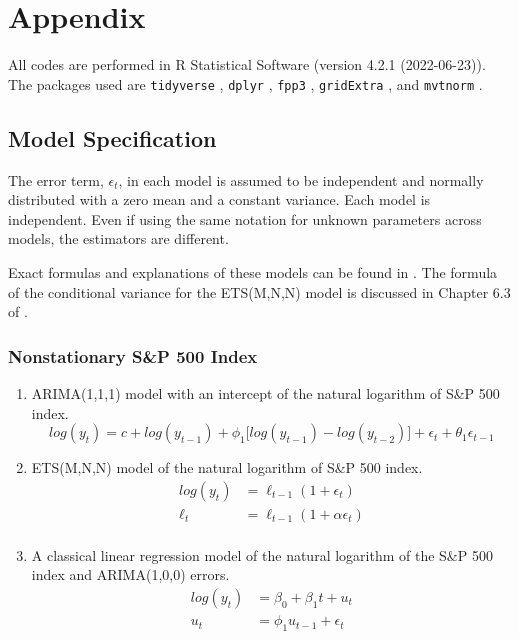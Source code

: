 \documentclass{monashthesis}
\begin{document}
\appendix

\hypertarget{appendix}{%
\chapter{Appendix}\label{appendix}}

All codes are performed in R Statistical Software (version 4.2.1 (2022-06-23)). The packages used are \texttt{tidyverse} \autocite{tidy19}, \texttt{dplyr} \autocite{dplyr23}, \texttt{fpp3} \autocite{fpp23}, \texttt{gridExtra} \autocite{gridExtra}, and \texttt{mvtnorm} \autocite{GBMMLSH21}.

\hypertarget{model-specification}{%
\section{Model Specification}\label{model-specification}}

The error term, \(\epsilon_t\), in each model is assumed to be independent and normally distributed with a zero mean and a constant variance. Each model is independent. Even if using the same notation for unknown parameters across models, the estimators are different.

Exact formulas and explanations of these models can be found in \textcite{fpp3}. The formula of the conditional variance for the ETS(M,N,N) model is discussed in Chapter 6.3 of \textcite{HKOS08}.

\hypertarget{nonstationary-sp-500-index}{%
\subsection{Nonstationary S\&P 500 Index}\label{nonstationary-sp-500-index}}

\begin{enumerate}
\def\labelenumi{\arabic{enumi}.}
\item
  ARIMA(1,1,1) model with an intercept of the natural logarithm of S\&P 500 index.
  \begin{equation*}
  log(y_t) = c + log(y_{t-1}) + \phi_1\big[log(y_{t-1})-log(y_{t-2})\big] + \epsilon_t + \theta_1\epsilon_{t-1}
  \end{equation*}
\item
  ETS(M,N,N) model of the natural logarithm of S\&P 500 index.
  \begin{align*}
  log(y_t) &= \ell_{t-1} (1+\epsilon_t) \\
  \ell_t &= \ell_{t-1} (1+\alpha \epsilon_t) \\
  \end{align*}
\item
  A classical linear regression model of the natural logarithm of the S\&P 500 index and ARIMA(1,0,0) errors.
  \begin{align*}
  log(y_t) &= \beta_0 + \beta_1 t + u_t \\
  u_t &= \phi_1 u_{t-1} + \epsilon_t
  \end{align*}
\end{enumerate}
\end{document}
